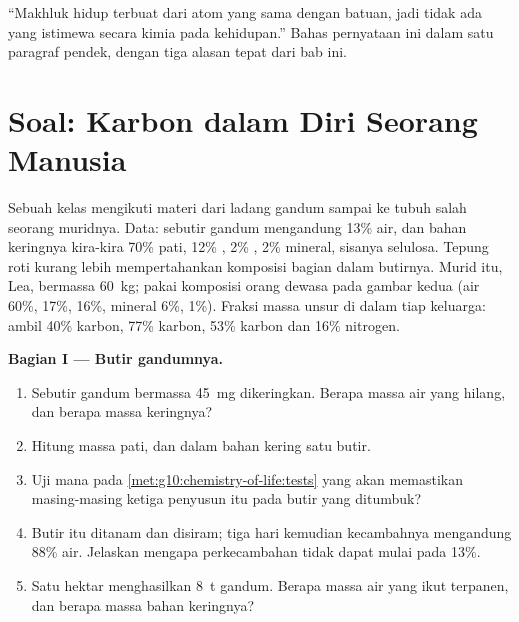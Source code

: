 \begin{exercise}[$\star\star\star$]\label{exo:g10:chemistry-of-life:15}
``Makhluk hidup terbuat dari atom yang sama dengan batuan, jadi tidak
ada yang istimewa secara kimia pada kehidupan.'' Bahas pernyataan ini
dalam satu paragraf pendek, dengan tiga alasan tepat dari bab ini.
\end{exercise}

\section{Soal: Karbon dalam Diri Seorang Manusia}

\begin{problem}
\label{pb:g10:chemistry-of-life:1}
Sebuah kelas mengikuti materi dari ladang gandum sampai ke tubuh salah
seorang muridnya. Data: sebutir gandum mengandung 13\% air, dan bahan
keringnya kira-kira 70\% pati, 12\% , 2\% , 2\% mineral, sisanya
selulosa. Tepung roti kurang lebih mempertahankan komposisi bagian
dalam butirnya. Murid itu, Lea, bermassa \qty{60}{kg}; pakai
komposisi orang dewasa pada gambar kedua (air 60\%,  17\%,
 16\%, mineral 6\%,  1\%). Fraksi massa unsur
di dalam tiap keluarga: ambil  40\% karbon,  77\%
karbon,  53\% karbon dan 16\% nitrogen.

\medskip
\noindent\textbf{Bagian I --- Butir gandumnya.}
\begin{enumerate}
  \item Sebutir gandum bermassa \qty{45}{mg} dikeringkan. Berapa massa
        air yang hilang, dan berapa massa keringnya?
  \item Hitung massa pati,  dan  dalam bahan
        kering satu butir.
  \item Uji mana pada \cref{met:g10:chemistry-of-life:tests} yang akan
        memastikan masing-masing ketiga penyusun itu pada butir yang ditumbuk?
  \item Butir itu ditanam dan disiram; tiga hari kemudian kecambahnya
        mengandung 88\% air. Jelaskan mengapa perkecambahan tidak dapat mulai pada 13\%.
  \item Satu hektar menghasilkan \qty{8}{t} gandum. Berapa massa air
        yang ikut terpanen, dan berapa massa bahan keringnya?
\end{enumerate}


\end{problem}
